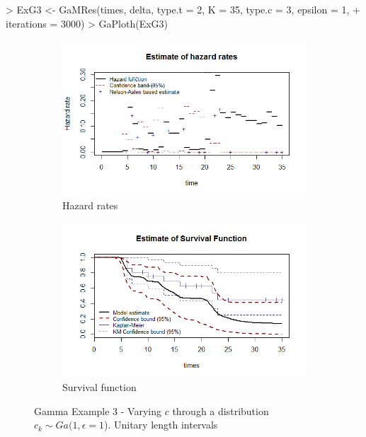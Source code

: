 \documentclass[letterpaper]{article}
\begin{document}
\begin{Schunk}
\begin{Sinput}
> ExG3 <- GaMRes(times, delta, type.t = 2, K = 35, type.c = 3, epsilon = 1,
+                iterations = 3000)
> GaPloth(ExG3)
\end{Sinput}
\end{Schunk}

\begin{figure}
  \centering
  \begin{subfigure}[a]{\textwidth}\centering
    \includegraphics[width=\textwidth]{G31.png}
    \caption{Hazard rates}
  \end{subfigure}
  \begin{subfigure}[b]{\textwidth}\centering
    \includegraphics[width=\textwidth]{G32.png}
    \caption{Survival function}
  \end{subfigure}
  \caption{Gamma Example 3 - Varying $c$ through a distribution $c_k\sim Ga(1,\epsilon = 1$). Unitary length intervals}
  \label{fig:G3}
\end{figure}
\end{document}
